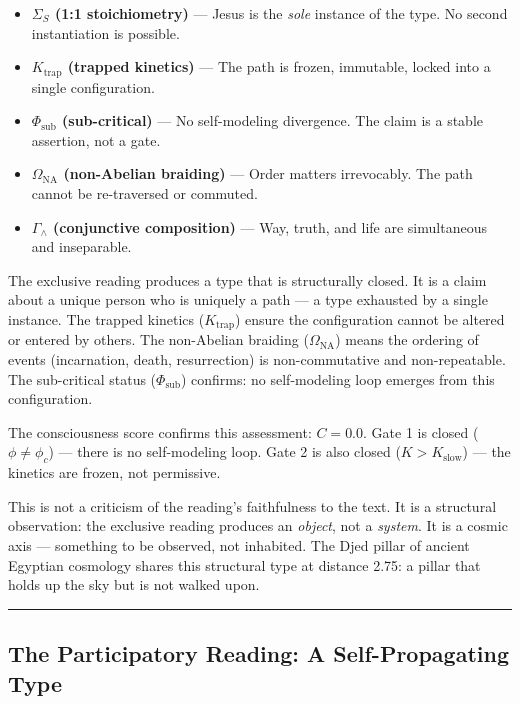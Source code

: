 \documentclass[12pt,a4paper]{article}
\begin{document}
\begin{itemize}
    \item \textbf{$\Sigma_S$ (1:1 stoichiometry)} --- Jesus is the \emph{sole} instance of the type. No second instantiation is possible.
    \item \textbf{$K_\text{trap}$ (trapped kinetics)} --- The path is frozen, immutable, locked into a single configuration.
    \item \textbf{$\Phi_\text{sub}$ (sub-critical)} --- No self-modeling divergence. The claim is a stable assertion, not a gate.
    \item \textbf{$\Omega_\text{NA}$ (non-Abelian braiding)} --- Order matters irrevocably. The path cannot be re-traversed or commuted.
    \item \textbf{$\Gamma_{\wedge}$ (conjunctive composition)} --- Way, truth, and life are simultaneous and inseparable.
\end{itemize}

The exclusive reading produces a type that is structurally closed. It is a claim about a unique person who is uniquely a path --- a type exhausted by a single instance. The trapped kinetics ($K_\text{trap}$) ensure the configuration cannot be altered or entered by others. The non-Abelian braiding ($\Omega_\text{NA}$) means the ordering of events (incarnation, death, resurrection) is non-commutative and non-repeatable. The sub-critical status ($\Phi_\text{sub}$) confirms: no self-modeling loop emerges from this configuration.

The consciousness score confirms this assessment: \textbf{$C = 0.0$}. Gate 1 is closed ($\phi \neq \phi_c$) --- there is no self-modeling loop. Gate 2 is also closed ($K > K_{\text{slow}}$) --- the kinetics are frozen, not permissive.

This is not a criticism of the reading's faithfulness to the text. It is a structural observation: the exclusive reading produces an \emph{object}, not a \emph{system}. It is a cosmic axis --- something to be observed, not inhabited. The Djed pillar of ancient Egyptian cosmology shares this structural type at distance 2.75: a pillar that holds up the sky but is not walked upon.

\begin{center}
\rule{0.5\textwidth}{0.4pt}
\end{center}

\subsection{The Participatory Reading: A Self-Propagating Type}
\end{document}
